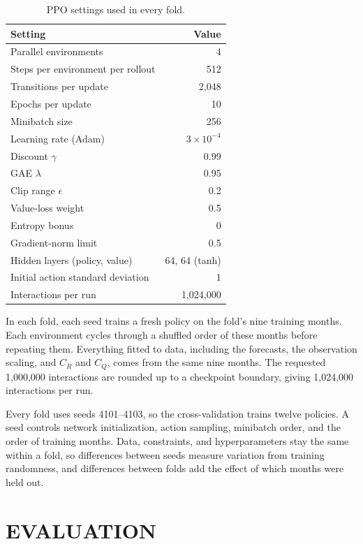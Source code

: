 \documentclass{UNCC-thesis}
\begin{document}
\begin{table}[htbp]
  \centering
  \footnotesize
  \caption{PPO settings used in every fold.}
  \label{tab:hyperparameters}
  \begin{tabular}{@{}lr@{}}
    \toprule
    Setting & Value \\
    \midrule
    Parallel environments & 4 \\
    Steps per environment per rollout & 512 \\
    Transitions per update & 2,048 \\
    Epochs per update & 10 \\
    Minibatch size & 256 \\
    Learning rate (Adam) & \(3\times10^{-4}\) \\
    Discount \(\gamma\) & 0.99 \\
    GAE \(\lambda\) & 0.95 \\
    Clip range \(\epsilon\) & 0.2 \\
    Value-loss weight & 0.5 \\
    Entropy bonus & 0 \\
    Gradient-norm limit & 0.5 \\
    Hidden layers (policy, value) & 64, 64 (tanh) \\
    Initial action standard deviation & 1 \\
    Interactions per run & 1,024,000 \\
    \bottomrule
  \end{tabular}
\end{table}

In each fold, each seed trains a fresh policy on the fold's nine training
months. Each environment cycles through a shuffled order of these months
before repeating them. Everything fitted to data, including the forecasts,
the observation scaling, and \(C_R\) and \(C_Q\), comes from the same nine
months. The requested 1,000,000 interactions are rounded up to a checkpoint
boundary, giving 1,024,000 interactions per run.

Every fold uses seeds 4101--4103, so the cross-validation trains twelve
policies. A seed controls network initialization, action sampling, minibatch
order, and the order of training months. Data, constraints, and
hyperparameters stay the same within a fold, so differences between seeds
measure variation from training randomness, and differences between folds
add the effect of which months were held out.

\chapter{EVALUATION}
\label{sec:evaluation}
\end{document}
